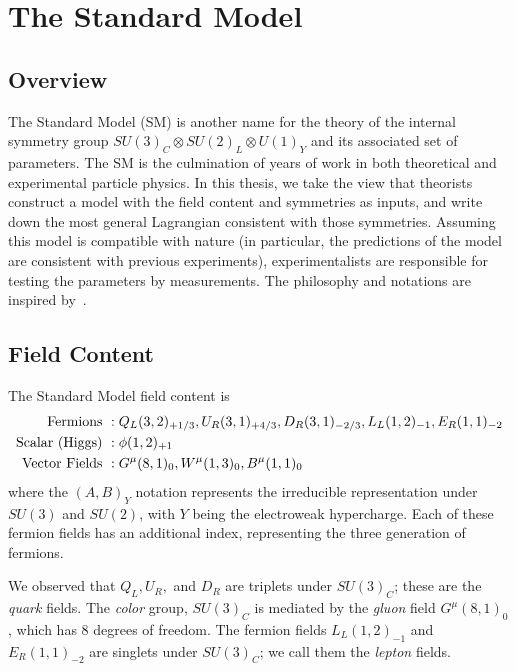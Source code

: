 \chapter{The Standard Model}\label{ch:sm}

\section{Overview}

The Standard Model (SM) is another name for the theory of the internal symmetry group $SU(3)_C \otimes SU(2)_L \otimes U(1)_Y$ and its associated set of parameters.
The SM is the culmination of years of work in both theoretical and experimental particle physics.
In this thesis, we take the view that theorists construct a model with the field content and symmetries as inputs, and write down the most general Lagrangian consistent with those symmetries.
Assuming this model is compatible with nature (in particular, the predictions of the model are consistent with previous experiments), experimentalists are responsible for testing the parameters by measurements.
The philosophy and notations are inspired by~\cite{yuvalSMLectures, Buchmuller:984122}.

\section{Field Content}\label{sec:field_content}

The Standard Model field content is
\begin{align}
\text{Fermions }       &:  Q_L(3,2)_{+1/3}, \xspace  U_R(3,1)_{+4/3},\xspace  D_R(3,1)_{-2/3} ,\xspace  L_L(1,2)_{-1} ,\xspace  E_R(1,1)_{-2} \notag \\
\text{Scalar (Higgs) } &:  \phi(1,2)_{+1} \\
\text{Vector Fields }  &:  G^\mu(8,1)_0 , \xspace W^\mu(1,3)_0 , \xspace B^\mu(1,1)_0 \notag
\end{align}
where the $(A, B)_Y$ notation represents the irreducible representation under $SU(3)$ and $SU(2)$, with $Y$ being the electroweak hypercharge.
Each of these fermion fields has an additional index, representing the three generation of fermions.

We observed that $Q_L, U_R,$ and $D_R$ are triplets under $SU(3)_C$; these are the \textit{quark} fields.
The \textit{color} group, $SU(3)_C$ is mediated by the \textit{gluon} field $G^\mu(8,1)_0$, which has 8 degrees of freedom.
The fermion fields $L_L(1,2)_{-1}$ and $  E_R(1,1)_{-2} $ are singlets under $SU(3)_C$; we call them the \textit{lepton} fields.

